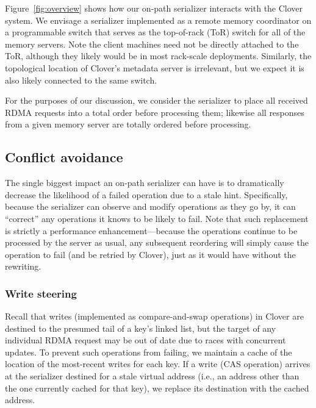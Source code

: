 
Figure~\ref{fig:overview} shows how our on-path serializer interacts
with the Clover system.  We envisage a serializer implemented as a
remote memory coordinator on a programmable switch that serves as the
top-of-rack (ToR) switch for all of the memory servers.  Note the
client machines need not be directly attached to the ToR, although
they likely would be in most rack-scale deployments.  Similarly, the
topological location of Clover's metadata server is irrelevant, but we
expect it is also likely connected to the same switch.

For the purposes of our discussion, we consider the serializer to
place all received RDMA requests into a total order before processing
them; likewise all responses from a given memory server are totally
ordered before processing.

\subsection{Conflict avoidance}

The single biggest impact an on-path serializer can have is to
dramatically decrease the likelihood of a failed operation due to a
stale hint.  Specifically, because the serializer can observe and
modify operations as they go by, it can ``correct'' any operations it
knows to be likely to fail.  Note that such replacement is strictly a
performance enhancement---because the operations continue to be
processed by the server as usual, any subsequent reordering will
simply cause the operation to fail (and be retried by Clover), just as
it would have without the rewriting.

\subsubsection{Write steering}

Recall that writes (implemented as compare-and-swap operations) in
Clover are destined to the presumed tail of a key's linked list, but
the target of any individual RDMA request may be out of date due to
races with concurrent updates.  To prevent such operations from
failing, we maintain a cache of the location of the most-recent writes
for each key. If a write (CAS operation) arrives at the serializer
destined for a stale virtual address (i.e., an address other than the
one currently cached for that key), we replace its destination with
the cached address.

